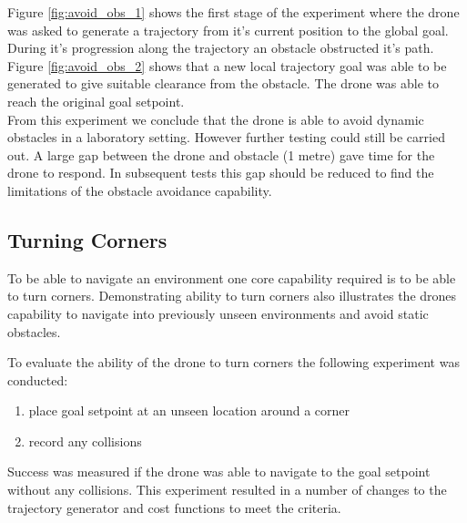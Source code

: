 \documentclass[capstone_report.tex]{subfiles}
\begin{document}
Figure \ref{fig:avoid_obs_1} shows the first stage of the experiment where the drone was asked to generate a trajectory from it's current position to the global goal.  During it's progression along the trajectory an obstacle obstructed it's path.   Figure \ref{fig:avoid_obs_2} shows that a new local trajectory goal was able to be generated to give suitable clearance from the obstacle.  The drone was able to reach the original goal setpoint.\\

From this experiment we conclude that the drone is able to avoid dynamic obstacles in a laboratory setting.  However further testing could still be carried out.  A large gap between the drone and obstacle (1 metre) gave time for the drone to respond.  In subsequent tests this gap should be reduced to find the limitations of the obstacle avoidance capability.

\subsection{Turning Corners}
To be able to navigate an environment one core capability required is to be able to turn corners.  Demonstrating ability to turn corners also illustrates the drones capability to navigate into previously unseen environments and avoid static obstacles.

To evaluate the ability of the drone to turn corners the following experiment was conducted:
\begin{enumerate}
    \item place goal setpoint at an unseen location around a corner
    \item record any collisions 
\end{enumerate}
Success was measured if the drone was able to navigate to the goal setpoint without any collisions.
This experiment resulted in a number of changes to the trajectory generator and cost functions to meet the criteria.
\end{document}
